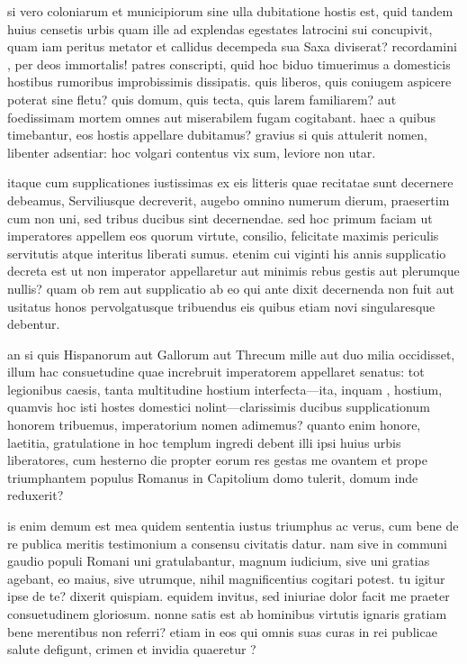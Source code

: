  si vero coloniarum et municipiorum sine ulla dubitatione hostis est, quid tandem huius censetis urbis quam ille ad explendas egestates latrocini sui concupivit, quam iam peritus metator et callidus decempeda sua Saxa diviserat? recordamini , per deos immortalis! patres conscripti, quid hoc biduo timuerimus a domesticis hostibus rumoribus improbissimis dissipatis. quis liberos, quis coniugem aspicere poterat sine fletu? quis domum, quis tecta, quis larem familiarem? aut foedissimam mortem omnes aut miserabilem fugam cogitabant. haec a quibus timebantur, eos hostis appellare dubitamus? gravius si quis attulerit nomen, libenter adsentiar: hoc volgari contentus vix sum, leviore non utar.

 itaque cum supplicationes iustissimas ex eis litteris quae recitatae sunt decernere debeamus, Serviliusque decreverit, augebo omnino numerum dierum, praesertim cum non uni, sed tribus ducibus sint decernendae. sed hoc primum faciam ut imperatores appellem eos quorum virtute, consilio, felicitate maximis periculis servitutis atque interitus liberati sumus. etenim cui viginti his annis supplicatio decreta est ut non imperator appellaretur aut minimis rebus gestis aut plerumque nullis? quam ob rem aut supplicatio ab eo qui ante dixit decernenda non fuit aut usitatus honos pervolgatusque tribuendus eis quibus etiam novi singularesque debentur.

 an si quis Hispanorum aut Gallorum aut Threcum mille aut duo milia occidisset, illum hac consuetudine quae increbruit imperatorem appellaret senatus: tot legionibus caesis, tanta multitudine hostium interfecta—ita, inquam , hostium, quamvis hoc isti hostes domestici nolint—clarissimis ducibus supplicationum honorem tribuemus, imperatorium nomen adimemus? quanto enim honore, laetitia, gratulatione in hoc templum ingredi debent illi ipsi huius urbis liberatores, cum hesterno die propter eorum res gestas me ovantem et prope triumphantem populus Romanus in Capitolium domo tulerit, domum inde reduxerit?

 is enim demum est mea quidem sententia iustus triumphus ac verus, cum bene de re publica meritis testimonium a consensu civitatis datur. nam sive in communi gaudio populi Romani uni gratulabantur, magnum iudicium, sive uni gratias agebant, eo maius, sive utrumque, nihil magnificentius cogitari potest. tu igitur ipse de te? dixerit quispiam. equidem invitus, sed iniuriae dolor facit me praeter consuetudinem gloriosum. nonne satis est ab hominibus virtutis ignaris gratiam bene merentibus non referri? etiam in eos qui omnis suas curas in rei publicae salute defigunt, crimen et invidia quaeretur ?

